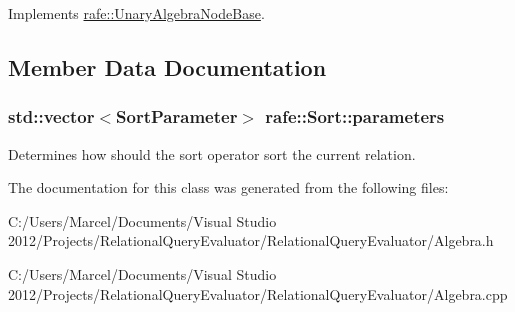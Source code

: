 Implements \hyperlink{classrafe_1_1_unary_algebra_node_base_a6f554aad7250a0f15730d10ae24e4a79}{rafe\+::\+Unary\+Algebra\+Node\+Base}.



\subsection{Member Data Documentation}
\hypertarget{classrafe_1_1_sort_a56fff2e57e874999e0bc44772b090129}{
\subsubsection[{parameters}]{\setlength{\rightskip}{0pt plus 5cm}std\+::vector$<${\bf Sort\+Parameter}$>$ rafe\+::\+Sort\+::parameters}}\label{classrafe_1_1_sort_a56fff2e57e874999e0bc44772b090129}
Determines how should the sort operator sort the current relation. 

The documentation for this class was generated from the following files\+:\begin{DoxyCompactItemize}
\item 
C\+:/\+Users/\+Marcel/\+Documents/\+Visual Studio 2012/\+Projects/\+Relational\+Query\+Evaluator/\+Relational\+Query\+Evaluator/Algebra.\+h\item 
C\+:/\+Users/\+Marcel/\+Documents/\+Visual Studio 2012/\+Projects/\+Relational\+Query\+Evaluator/\+Relational\+Query\+Evaluator/Algebra.\+cpp\end{DoxyCompactItemize}
